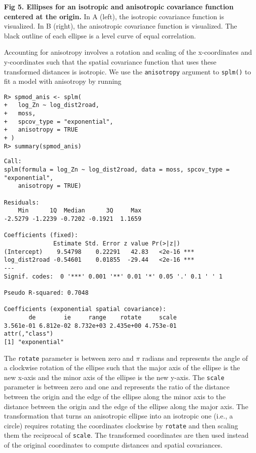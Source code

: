 \documentclass[10pt,letterpaper]{article}
\begin{document}
\textbf{Fig 5. Ellipses for an isotropic and anisotropic covariance
function centered at the origin.} In A (left), the isotropic covariance
function is visualized. In B (right), the anisotropic covariance
function is visualized. The black outline of each ellipse is a level
curve of equal correlation.

Accounting for anisotropy involves a rotation and scaling of the
x-coordinates and y-coordinates such that the spatial covariance
function that uses these transformed distances is isotropic. We use the
\texttt{anisotropy} argument to \texttt{splm()} to fit a model with
anisotropy by running

\begin{verbatim}
R> spmod_anis <- splm(
+   log_Zn ~ log_dist2road,
+   moss,
+   spcov_type = "exponential",
+   anisotropy = TRUE
+ )
R> summary(spmod_anis)
\end{verbatim}

\begin{verbatim}
Call:
splm(formula = log_Zn ~ log_dist2road, data = moss, spcov_type = "exponential", 
    anisotropy = TRUE)

Residuals:
    Min      1Q  Median      3Q     Max 
-2.5279 -1.2239 -0.7202 -0.1921  1.1659 

Coefficients (fixed):
              Estimate Std. Error z value Pr(>|z|)    
(Intercept)    9.54798    0.22291   42.83   <2e-16 ***
log_dist2road -0.54601    0.01855  -29.44   <2e-16 ***
---
Signif. codes:  0 '***' 0.001 '**' 0.01 '*' 0.05 '.' 0.1 ' ' 1

Pseudo R-squared: 0.7048

Coefficients (exponential spatial covariance):
       de        ie     range    rotate     scale 
3.561e-01 6.812e-02 8.732e+03 2.435e+00 4.753e-01 
attr(,"class")
[1] "exponential"
\end{verbatim}

\noindent The \texttt{rotate} parameter is between zero and \(\pi\)
radians and represents the angle of a clockwise rotation of the ellipse
such that the major axis of the ellipse is the new x-axis and the minor
axis of the ellipse is the new y-axis. The \texttt{scale} parameter is
between zero and one and represents the ratio of the distance between
the origin and the edge of the ellipse along the minor axis to the
distance between the origin and the edge of the ellipse along the major
axis. The transformation that turns an anisotropic ellipse into an
isotropic one (i.e., a circle) requires rotating the coordinates
clockwise by \texttt{rotate} and then scaling them the reciprocal of
\texttt{scale}. The transformed coordinates are then used instead of the
original coordinates to compute distances and spatial covariances.
\end{document}
